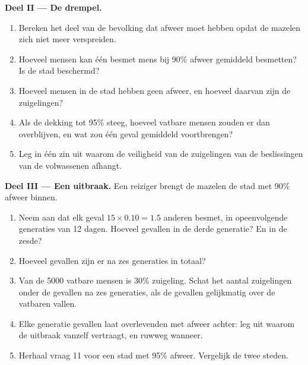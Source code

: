 \begin{problem}
\medskip
\noindent\textbf{Deel II --- De drempel.}
\begin{enumerate}[resume]
  \item Bereken het deel van de bevolking dat afweer moet hebben opdat de
        mazelen zich niet meer verspreiden.
  \item Hoeveel mensen kan één besmet mens bij 90\% afweer gemiddeld
        besmetten? Is de stad beschermd?
  \item Hoeveel mensen in de stad hebben geen afweer, en hoeveel daarvan
        zijn de zuigelingen?
  \item Als de dekking tot 95\% steeg, hoeveel vatbare mensen zouden er
        dan overblijven, en wat zou één geval gemiddeld voortbrengen?
  \item Leg in één zin uit waarom de veiligheid van de zuigelingen van de
        beslissingen van de volwassenen afhangt.
\end{enumerate}

\medskip
\noindent\textbf{Deel III --- Een uitbraak.}
Een reiziger brengt de mazelen de stad met 90\% afweer binnen.
\begin{enumerate}[resume]
  \item Neem aan dat elk geval $15 \times 0.10 = 1.5$ anderen besmet, in
        opeenvolgende generaties van 12 dagen. Hoeveel gevallen in de
        derde generatie? En in de zesde?
  \item Hoeveel gevallen zijn er na zes generaties in totaal?
  \item Van de 5000 vatbare mensen is 30\% zuigeling. Schat het aantal
        zuigelingen onder de gevallen na zes generaties, als de gevallen
        gelijkmatig over de vatbaren vallen.
  \item Elke generatie gevallen laat overlevenden met afweer achter: leg
        uit waarom de uitbraak vanzelf vertraagt, en ruwweg wanneer.
  \item Herhaal vraag 11 voor een stad met 95\% afweer. Vergelijk de twee
        steden.
\end{enumerate}


\end{problem}
